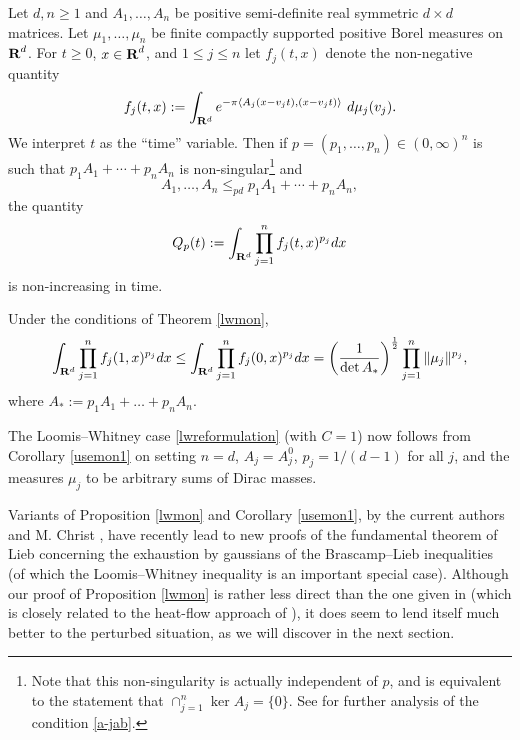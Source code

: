 \begin{proposition}\label{lwmon} Let $d,n\geq 1$ and
$A_1, \ldots, A_n$ be positive semi-definite real symmetric
$d\times d$ matrices. Let
$\mu_1, \ldots, \mu_n$ be finite compactly supported
positive Borel measures on ${\hbox{\bf R}}^d$.  For $t
\geq 0$, $x \in {\hbox{\bf R}}^d$, and $1 \leq j \leq n$ let $f_j(t,x)$ denote
the non-negative quantity
$$ f_j(t,x) := \int_{{\bf R}^d} e^{-\pi \langle A_j(x-v_jt), (x-v_jt) \rangle}\ d\mu_j(v_j).$$
We interpret $t$ as the ``time'' variable.
Then if $p=(p_{1},\hdots,p_n)\in (0,\infty)^{n}$
is such that $p_{1}A_1+\cdots+p_{n}A_n$ is
non-singular\footnote{Note that this non-singularity is actually independent
of $p$, and is equivalent to the statement that
$\cap_{j=1}^{n}\ker A_j=\{0\}$.  See \cite{BCCT} for further analysis of the condition \eqref{a-jab}.} and
\begin{equation}\label{a-jab}
A_1, \ldots, A_n \leq_{pd} p_1A_1 + \cdots + p_{n}A_n,
\end{equation}
the quantity $$
Q_p(t) := \int_{{\bf R}^{d}}\prod_{j=1}^n
f_j(t,x)^{p_{j}}dx$$ is non-increasing in time.
\end{proposition}
\begin{corollary}\label{usemon1}
Under the conditions of Theorem \ref{lwmon},
$$\int_{{\bf R}^{d}}\prod_{j=1}^{n}f_{j}(1,x)^{p_{j}}dx
\leq\int_{{\bf R}^{d}}\prod_{j=1}^{n}f_{j}(0,x)^{p_{j}}dx
=\left(\frac{1}{\det
A_*}\right)^{\frac{1}{2}}\prod_{j=1}^{n}\|\mu_{j}\|^{p_{j}},
$$
where $A_*:=p_1A_1+\ldots+p_nA_n$.
\end{corollary}
\begin{remark}
The Loomis--Whitney case \eqref{lwreformulation} (with $C=1$) now follows from
Corollary \ref{usemon1} on setting $n=d$, $A_j = A_j^0$, $p_j =
1/(d-1)$ for all $j$, and the measures $\mu_j$ to be arbitrary
sums of Dirac masses.
\end{remark}
\begin{remark}\label{brascamp-remark}
Variants of Proposition \ref{lwmon} and Corollary \ref{usemon1}, by the current
authors and M. Christ \cite{BCCT}, have recently lead to new
proofs of the fundamental theorem of Lieb \cite{Lieb} concerning
the exhaustion by gaussians of the Brascamp--Lieb inequalities (of
which the Loomis--Whitney inequality is an important special case).
Although our proof of Proposition \ref{lwmon} is rather less
direct than the one given in \cite{BCCT} (which is closely related
to the heat-flow approach of \cite{CLL}), it does seem to lend
itself much better to the perturbed situation, as we will discover
in the next section.
\end{remark}
